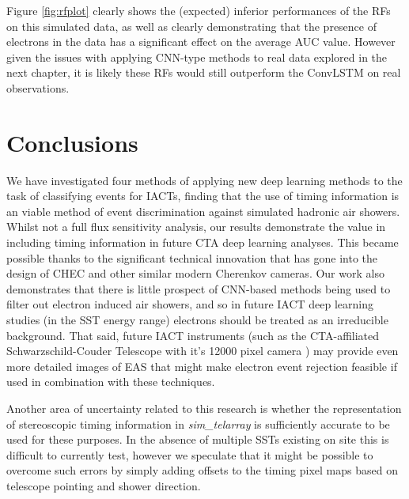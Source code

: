 Figure \ref{fig:rfplot} clearly shows the (expected) inferior performances of the RFs on this simulated data, as well as clearly demonstrating that the presence of electrons in the data has a significant effect on the average AUC value. However given the issues with applying CNN-type methods to real data explored in the next chapter, it is likely these RFs would still outperform the ConvLSTM on real observations.

\section{Conclusions} \label{Conclusions}
We have investigated four methods of applying new deep learning methods to the task of classifying events for IACTs, finding that the use of timing information is an viable method of event discrimination against simulated hadronic air showers. Whilst not a full flux sensitivity analysis, our results demonstrate the value in including timing information in future CTA deep learning analyses. This became possible thanks to the significant technical innovation that has gone into the design of CHEC and other similar modern Cherenkov cameras. Our work also demonstrates that there is little prospect of CNN-based methods being used to filter out electron induced air showers, and so in future IACT deep learning studies (in the SST energy range) electrons should be treated as an irreducible background. That said, future IACT instruments (such as the CTA-affiliated Schwarzschild-Couder Telescope with it's 12000 pixel camera \cite{psct}) may provide even more detailed images of EAS that might make electron event rejection feasible if used in combination with these techniques.

Another area of uncertainty related to this research is whether the representation of stereoscopic timing information in \textit{sim\_telarray} is sufficiently accurate to be used for these purposes. In the absence of multiple SSTs existing on site this is difficult to currently test, however we speculate that it might be possible to overcome such errors by simply adding offsets to the timing pixel maps based on telescope pointing and shower direction.

